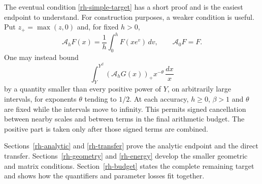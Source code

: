 The eventual condition \eqref{rh-simple-target} has a short proof and
is the easiest endpoint to understand. For construction purposes, a
weaker condition is useful. Put $z_+=\max(z,0)$ and, for fixed $h>0$,
\[
 \mathcal A_hF(x)=\frac1h\int_0^hF(xe^v)\,dv,
 \qquad \mathcal A_0F=F.
\]
One may instead bound
\[
 \int_Y^{Y^\beta}(\mathcal A_hG(x))_+
                          x^{-\theta}\,\frac{dx}{x}
\]
by a quantity smaller than every positive power of $Y$, on arbitrarily
large intervals, for exponents $\theta$ tending to $1/2$.
At each accuracy, $h\ge0$, $\beta>1$ and $\theta$ are fixed while the
intervals move to infinity. This permits signed cancellation between
nearby scales and between terms in the final arithmetic budget. The
positive part is taken only after those signed terms are combined.

Sections~\ref{rh-analytic} and \ref{rh-transfer} prove the analytic
endpoint and the direct transfer. Sections~\ref{rh-geometry} and
\ref{rh-energy} develop the smaller geometric and matrix conditions.
Section~\ref{rh-budget} states the complete remaining target and shows
how the quantifiers and parameter losses fit together.
